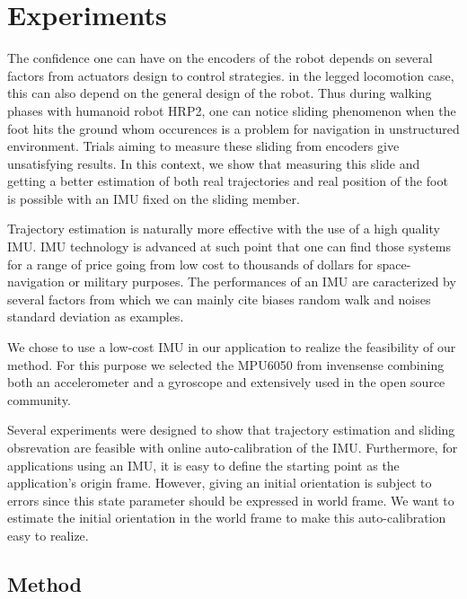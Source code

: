 
\section{Experiments} \label{sec:experiments}

The confidence one can have on the encoders of the robot depends on several factors from actuators design to control strategies. in the legged locomotion case, this can also depend on the general design of the robot.
Thus during walking phases with humanoid robot HRP2, one can notice sliding phenomenon when the foot hits the ground whom occurences is a problem for navigation in unstructured environment. Trials aiming to measure these sliding from encoders give
unsatisfying results. In this context, we show that measuring this slide and getting a better estimation of both real trajectories and real position of the foot is possible with an IMU fixed on the sliding member.

Trajectory estimation is naturally more effective with the use of a high quality IMU. IMU technology is advanced at such point that 
one can find those systems for a range of price going from low cost to thousands of dollars for space-navigation or military purposes.
The performances of an IMU are caracterized by several factors from which we can mainly cite biases random walk and noises standard deviation
as examples.

We chose to use a low-cost IMU in our application to realize the feasibility of our method. For this purpose we selected the 
MPU6050 from invensense combining both an accelerometer and a gyroscope and extensively used in the open source community.

Several experiments were designed to show that trajectory estimation and sliding obsrevation are feasible with online auto-calibration of the IMU.
Furthermore, for applications using an IMU, it is easy to define the starting point as the application's origin frame. However, giving an initial orientation is subject to errors since this state parameter should be expressed in world frame.
We want to estimate the initial orientation in the world frame to make this auto-calibration easy to realize. 


\subsection{Method}
